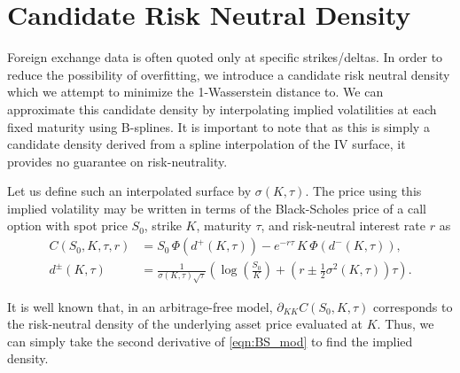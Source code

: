 \documentclass[onefignum,onetabnum]{siamonline190516}
\begin{document}
\section{Candidate Risk Neutral Density}
\label{sec:ERDens}
{

Foreign exchange data is often quoted only at specific strikes/deltas. In order to reduce the possibility of overfitting, we introduce a candidate risk neutral density which we attempt to minimize the 1-Wasserstein distance to. We can approximate this candidate density by interpolating implied volatilities at each fixed maturity using B-splines. It is important to note that as this is simply a candidate density derived from a spline interpolation of the IV surface, it provides no guarantee on risk-neutrality. 

Let us define such an interpolated surface by $\sigma(K, \tau)$. The price using this implied volatility may be written in terms of the Black-Scholes price of a call option with spot price $S_0$, strike $K$, maturity $\tau$, and risk-neutral interest rate $r$ as
\begin{align}
\label{eqn:BS_mod}
    C(S_0, K, \tau, r) &= S_0\, \Phi(d^+(K,\tau)) - e^{-{r \tau}}\, K\, \Phi(d^-(K,\tau)),
    \\
    d^\pm(K,\tau) &= \frac{1}{ \sigma(K,\tau) \sqrt{\tau}}\left(\log\left(\tfrac{S_0}{K}\right) + ({r} \pm \tfrac{1}{2} \sigma^2(K,\tau)) \tau\right).
\end{align}

It is well known \cite{breeden1978prices} that, in an arbitrage-free model, $\partial_{KK} C(S_0, K, \tau)$ corresponds to the risk-neutral density of the underlying asset price evaluated at $K$. Thus, we can simply take the second derivative of \ref{eqn:BS_mod} to find the implied density. 

}
\end{document}
